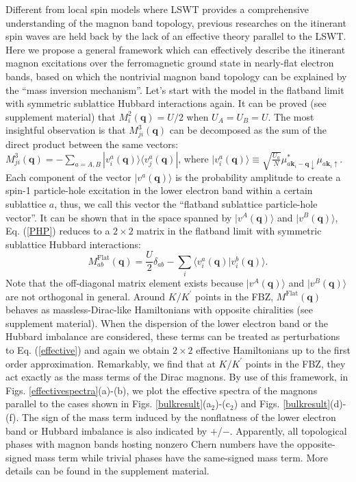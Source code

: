 \documentclass[amsmath,superscriptaddress,showpacs,aps,prl,twocolumn]{revtex4-1}
\begin{document}
\par Different from local spin models where LSWT provides a comprehensive understanding of the magnon band topology, previous researches \cite{Su_PRB2018} on the itinerant spin waves are held back by the lack of an effective theory parallel to the LSWT. Here we propose a general framework which can effectively describe the itinerant magnon excitations over the ferromagnetic ground state in nearly-flat electron bands, based on which the nontrivial magnon band topology can be explained by the ``mass inversion mechanism''. Let's start with the model in the flatband limit with symmetric sublattice Hubbard interactions again. It can be proved (see supplement material) that $M^2_i(\mathbf{q})=U/2$ when $U_A=U_B=U$. The most insightful observation is that $M^3_{ji}(\mathbf{q})$ can be decomposed as the sum of the direct product between the same vectors: $M^3_{ji}(\mathbf{q})=-\sum_{a=A,B}|v^a_i(\mathbf{q})\rangle\langle v^a_j(\mathbf{q})|$, where $|v^a_i(\mathbf{q})\rangle\equiv\sqrt{\frac{U_a}{N}}\mu^{\ast}_{a\mathbf{k}_i-\mathbf{q}\downarrow}\mu_{a\mathbf{k}_{i}\uparrow}$. Each component of the vector $|v^a(\mathbf{q})\rangle$ is the probability amplitude to create a spin-1 particle-hole excitation in the lower electron band within a certain sublattice $a$, thus, we call this vector the ``flatband sublattice particle-hole vector''. It can be shown that in the space spanned by $|v^A(\mathbf{q})\rangle$ and $|v^B(\mathbf{q})\rangle$, Eq. (\ref{PHP}) reduces to a $2\times2$ matrix in the flatband limit with symmetric sublattice Hubbard interactions:
\begin{equation}\label{effective}
M^\text{Flat}_{ab}(\mathbf{q})=\frac{U}{2}\delta_{ab}-\sum_i\langle v_i^a(\mathbf{q})|v_i^b(\mathbf{q})\rangle.
\end{equation}
Note that the off-diagonal matrix element exists because $|v^A(\mathbf{q})\rangle$ and $|v^B(\mathbf{q})\rangle$ are not orthogonal in general. Around $K/K^\prime$ points in the FBZ, $M^\text{Flat}(\mathbf{q})$ behaves as massless-Dirac-like Hamiltonians with opposite chiralities (see supplement material). When the dispersion of the lower electron band or the Hubbard imbalance are considered, these terms can be treated as perturbations to Eq. (\ref{effective}) and again we obtain $2\times2$ effective Hamiltonians up to the first order approximation. Remarkably, we find that at $K/K^\prime$ points in the FBZ, they act exactly as the mass terms of the Dirac magnons. By use of this framework, in Figs. \ref{effectivespectra}(a)-(b), we plot the effective spectra of the magnons parallel to the cases shown in Figs. \ref{bulkresult}(a$_2$)-(c$_2$) and Figs. \ref{bulkresult}(d)-(f). The sign of the mass term induced by the nonflatness of the lower electron band or Hubbard imbalance is also indicated by $+$/$-$. Apparently, all topological phases with magnon bands hosting nonzero Chern numbers have the opposite-signed mass term while trivial phases have the same-signed mass term. More details can be found in the supplement material.
\end{document}

